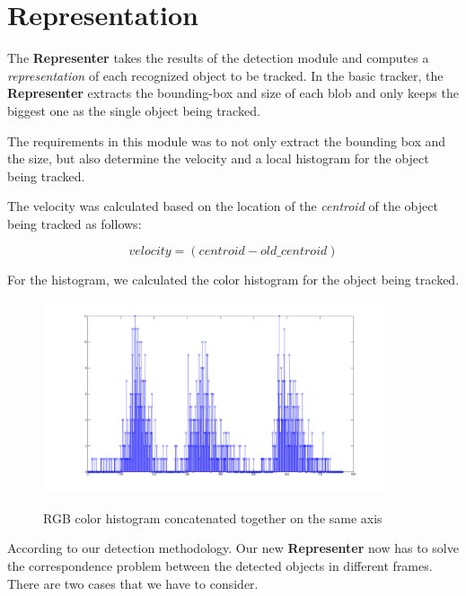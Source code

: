 \section{Representation}

The \textbf{Representer} takes the results of the detection module and computes a \textit{representation} of each recognized object to be tracked. In the basic tracker, the \textbf{Representer} extracts the bounding-box and size of each blob and only keeps the biggest one as the single object being tracked.

The requirements in this module was to not only extract the bounding box and the size, but also determine the velocity and a local histogram for the object being tracked.

The velocity was calculated based on the location of the \textit{centroid} of the object being tracked as follows:

\begin{equation}
velocity = (centroid - old\_centroid)%
\end{equation}


For the histogram, we calculated the color histogram for the object being tracked.

\begin{figure}[Color histogram]{\includegraphics[width=0.9\textwidth]{histogram_car}}
  \centering
  \caption{RGB color histogram concatenated together on the same axis}
\end{figure}

According to our detection methodology. Our new \textbf{Representer} now has to solve the correspondence problem between the detected objects in different frames. There are two cases that we have to consider.

